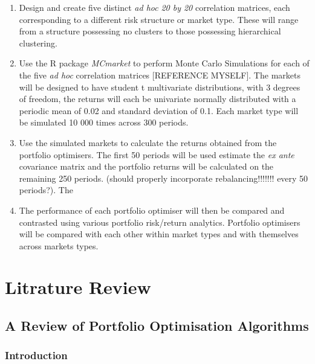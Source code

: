 \documentclass[11pt,preprint, authoryear]{elsarticle}
\numberwithin{equation}{section}
\numberwithin{figure}{section}
\numberwithin{table}{section}
\begin{document}
\begin{enumerate}
\def\labelenumi{\arabic{enumi}.}
\item
  Design and create five distinct \emph{ad hoc} \emph{20 by 20}
  correlation matrices, each corresponding to a different risk structure
  or market type. These will range from a structure possessing no
  clusters to those possessing hierarchical clustering.
\item
  Use the R package \emph{MCmarket} to perform Monte Carlo Simulations
  for each of the five \emph{ad hoc} correlation matrices {[}REFERENCE
  MYSELF{]}. The markets will be designed to have student t multivariate
  distributions, with 3 degrees of freedom, the returns will each be
  univariate normally distributed with a periodic mean of 0.02 and
  standard deviation of 0.1. Each market type will be simulated 10 000
  times across 300 periods.
\item
  Use the simulated markets to calculate the returns obtained from the
  portfolio optimisers. The first 50 periods will be used estimate the
  \emph{ex ante} covariance matrix and the portfolio returns will be
  calculated on the remaining 250 periods. (should properly incorporate
  rebalancing!!!!!!! every 50 periods?). The
\item
  The performance of each portfolio optimiser will then be compared and
  contrasted using various portfolio risk/return analytics. Portfolio
  optimisers will be compared with each other within market types and
  with themselves across markets types.
\end{enumerate}

\hypertarget{litrature-review}{%
\section{Litrature Review}\label{litrature-review}}

\hypertarget{a-review-of-portfolio-optimisation-algorithms}{%
\subsection{A Review of Portfolio Optimisation
Algorithms}\label{a-review-of-portfolio-optimisation-algorithms}}

\hypertarget{introduction-1}{%
\subsubsection{Introduction}\label{introduction-1}}
\end{document}
